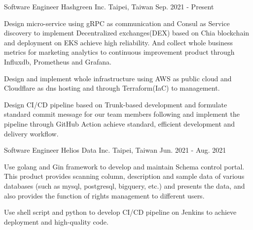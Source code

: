 

\begin{cventries}

\cventry
{Software Engineer} %
{Hashgreen Inc.} %
{Taipei, Taiwan} %
{Sep. 2021 - Present} %
{
  \begin{cvitems} %
    \item {Design micro-service using gRPC as communication and Consul as Service discovery to implement Decentralized exchanges(DEX) based on Chia blockchain and deployment on EKS achieve high reliability. And collect whole business metrics for marketing analytics to continuous improvement product through Influxdb, Prometheus and Grafana.}
    \item {Design and implement whole infrastructure using AWS as public cloud and Cloudflare as dns hosting and through Terraform(IaC) to management.}
    \item {Design CI/CD pipeline based on Trunk-based development and formulate standard commit message for our team members following and implement the pipeline through GitHub Action achieve standard, efficient development and delivery workflow.}
  \end{cvitems}
}

\cventry
{Software Engineer} %
{Helios Data Inc.} %
{Taipei, Taiwan} %
{Jun. 2021 - Aug. 2021} %
{
  \begin{cvitems} %
    \item {Use golang and Gin framework to develop and maintain Schema control portal. This product provides scanning column, description and sample data of various databases (such as mysql, postgresql, bigquery, etc.) and presents the data, and also provides the function of rights management to different users.}
    \item {Use shell script and python to develop CI/CD pipeline on Jenkins to achieve deployment and high-quality code.}
  \end{cvitems}
}


\end{cventries}
